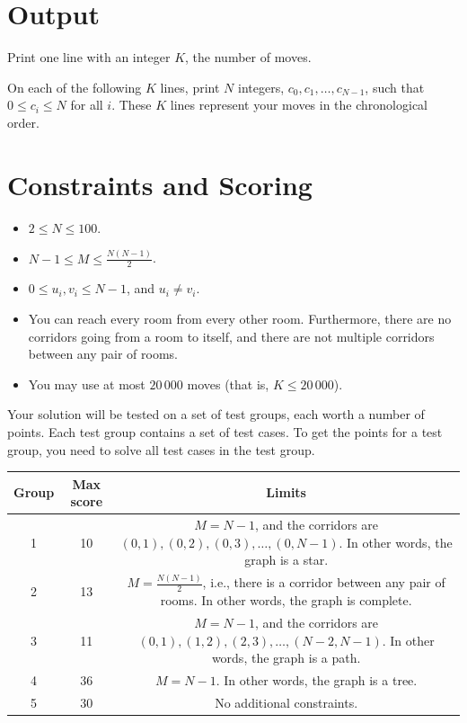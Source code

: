 \section*{Output}
Print one line with an integer $K$, the number of moves.

On each of the following $K$ lines, print $N$ integers, $c_0, c_1, \ldots, c_{N-1}$, such that $0\le c_i\le N$ for all $i$. These $K$ lines represent your moves in the chronological order.

\section*{Constraints and Scoring}
\begin{itemize}
\item $2 \leq N \leq 100$.
\item $N-1 \leq M \leq \frac{N(N-1)}{2}$.
\item $0 \leq u_i, v_i \leq N-1$, and $u_{i}\neq v_{i}$.
\item You can reach every room from every other room. Furthermore, there are no corridors going from a room to itself, and there are not multiple corridors between any pair of rooms. 
\item You may use at most $20\,000$ moves (that is, $K\le 20\,000$).
\end{itemize}

Your solution will be tested on a set of test groups, each worth a number of points.
Each test group contains a set of test cases. To get the points for a test group, you need to solve all test cases in the test group.



\begin{tabular}{|c|c|c|}
\hline
Group  &  Max score  &  Limits \\
\hline
  1 & 10 & $M = N-1$, and the corridors are $(0,1), (0,2), (0,3), \ldots, (0,N-1)$. In other words, the graph is a star.   \\
\hline
  2 & 13 & $M = \frac{N(N-1)}{2}$, i.e., there is a corridor between any pair of rooms. In other words, the graph is complete.   \\
\hline
  3 & 11 & $M = N-1$, and the corridors are $(0,1), (1,2), (2,3), \ldots, (N-2,N-1)$. In other words, the graph is a path.   \\
\hline
  4 & 36 & $M = N-1$. In other words, the graph is a tree.   \\
\hline
  5 & 30 & No additional constraints.   \\
\hline
\end{tabular}

